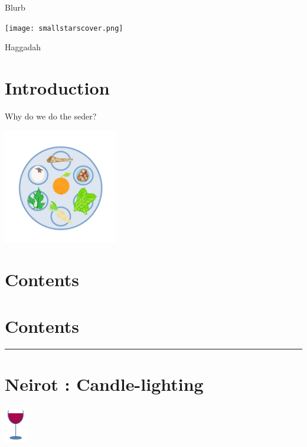 \documentclass[a5paper,10pt]{memoir}
\begin{document}
	Blurb
\onecolumn

\texttt{[image: smallstarscover.png]}

\vspace*{-100ex}  %
\begin{center}
	\noindent \HUGE \color{cyan} Haggadah\centering
	\vfill
	\end{center}
\vspace*{80ex}  %

\section{Introduction}
{Why do we do the seder?}\\
\begin{center}
	\includegraphics[width=50mm]{Sederplate}
	\end{center}
\onecolumn
\section{Contents}
\ContentsTabular
\section{Contents}{%
	\ContentsColumnar
	\noindent
{\color{cyan} \rule{\linewidth}{0.5mm}}
}
\onecolumn
%
\section{Neirot : Candle-lighting}

\Neirot
\vspace*{2ex}
\Shehechyanu
\hfill\includegraphics[width=10mm]{cup}
\vspace*{-15ex}  %
		
\end{document}
